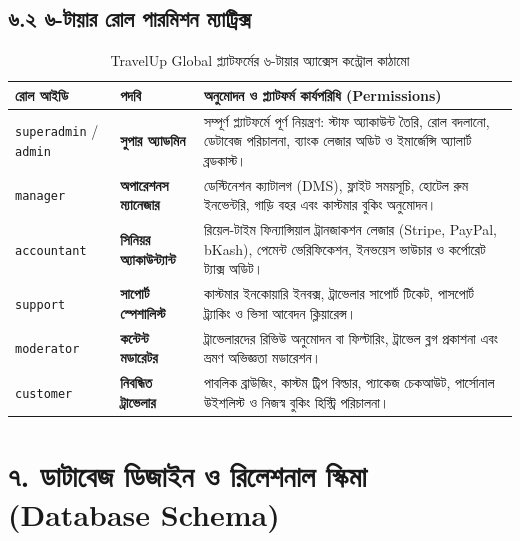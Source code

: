 \documentclass[11pt,a4paper]{article}
\begin{document}
\subsection{৬.২ ৬-টায়ার রোল পারমিশন ম্যাট্রিক্স}
\begin{table}[H]
\centering
\footnotesize
\begin{tabularx}{\textwidth}{l p{3.2cm} X}
\toprule
\textbf{রোল আইডি} & \textbf{পদবি} & \textbf{অনুমোদন ও প্ল্যাটফর্ম কার্যপরিধি (Permissions)} \\
\midrule
\texttt{superadmin} / \texttt{admin} & \textbf{সুপার অ্যাডমিন} & সম্পূর্ণ প্ল্যাটফর্মে পূর্ণ নিয়ন্ত্রণ: স্টাফ অ্যাকাউন্ট তৈরি, রোল বদলানো, ডেটাবেজ পরিচালনা, ব্যাংক লেজার অডিট ও ইমার্জেন্সি অ্যালার্ট ব্রডকাস্ট। \\
\addlinespace
\texttt{manager} & \textbf{অপারেশনস ম্যানেজার} & ডেস্টিনেশন ক্যাটালগ (DMS), ফ্লাইট সময়সূচি, হোটেল রুম ইনভেন্টরি, গাড়ি বহর এবং কাস্টমার বুকিং অনুমোদন। \\
\addlinespace
\texttt{accountant} & \textbf{সিনিয়র অ্যাকাউন্ট্যান্ট} & রিয়েল-টাইম ফিন্যান্সিয়াল ট্রানজাকশন লেজার (Stripe, PayPal, bKash), পেমেন্ট ভেরিফিকেশন, ইনভয়েস ভাউচার ও কর্পোরেট ট্যাক্স অডিট। \\
\addlinespace
\texttt{support} & \textbf{সাপোর্ট স্পেশালিস্ট} & কাস্টমার ইনকোয়ারি ইনবক্স, ট্রাভেলার সাপোর্ট টিকেট, পাসপোর্ট ট্র্যাকিং ও ভিসা আবেদন ক্লিয়ারেন্স। \\
\addlinespace
\texttt{moderator} & \textbf{কন্টেন্ট মডারেটর} & ট্রাভেলারদের রিভিউ অনুমোদন বা ফিল্টারিং, ট্রাভেল ব্লগ প্রকাশনা এবং ভ্রমণ অভিজ্ঞতা মডারেশন। \\
\addlinespace
\texttt{customer} & \textbf{নিবন্ধিত ট্রাভেলার} & পাবলিক ব্রাউজিং, কাস্টম ট্রিপ বিল্ডার, প্যাকেজ চেকআউট, পার্সোনাল উইশলিস্ট ও নিজস্ব বুকিং হিস্ট্রি পরিচালনা। \\
\bottomrule
\end{tabularx}
\caption{TravelUp Global প্ল্যাটফর্মের ৬-টায়ার অ্যাক্সেস কন্ট্রোল কাঠামো}
\end{table}

\newpage

\section{৭. ডাটাবেজ ডিজাইন ও রিলেশনাল স্কিমা (Database Schema)}
\end{document}
